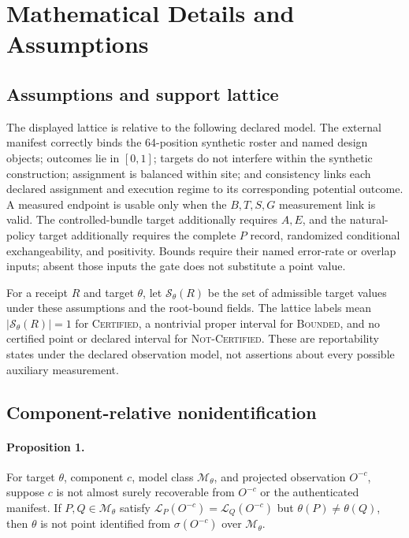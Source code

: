 \documentclass{article}
\newcommand{\cert}{\textsc{Certified}\xspace}
\newcommand{\bounded}{\textsc{Bounded}\xspace}
\newcommand{\notcert}{\textsc{Not-Certified}\xspace}
\begin{document}



\appendix

\section{Mathematical Details and Assumptions}
\label{app:mathematical-details}

\subsection{Assumptions and support lattice}

The displayed lattice is relative to the following declared model. The external manifest correctly binds the 64-position synthetic roster and named design objects; outcomes lie in $[0,1]$; targets do not interfere within the synthetic construction; assignment is balanced within site; and consistency links each declared assignment and execution regime to its corresponding potential outcome. A measured endpoint is usable only when the $B,T,S,G$ measurement link is valid. The controlled-bundle target additionally requires $A,E$, and the natural-policy target additionally requires the complete $P$ record, randomized conditional exchangeability, and positivity. Bounds require their named error-rate or overlap inputs; absent those inputs the gate does not substitute a point value.

For a receipt $R$ and target $\theta$, let $\mathcal S_\theta(R)$ be the set of admissible target values under these assumptions and the root-bound fields. The lattice labels mean $|\mathcal S_\theta(R)|=1$ for \cert, a nontrivial proper interval for \bounded, and no certified point or declared interval for \notcert. These are reportability states under the declared observation model, not assertions about every possible auxiliary measurement.

\subsection{Component-relative nonidentification}

\paragraph{Proposition 1.}
For target $\theta$, component $c$, model class $\mathcal M_\theta$, and projected observation $O^{-c}$, suppose $c$ is not almost surely recoverable from $O^{-c}$ or the authenticated manifest. If $P,Q\in\mathcal M_\theta$ satisfy $\mathcal L_P(O^{-c})=\mathcal L_Q(O^{-c})$ but $\theta(P)\ne\theta(Q)$, then $\theta$ is not point identified from $\sigma(O^{-c})$ over $\mathcal M_\theta$.
\end{document}
